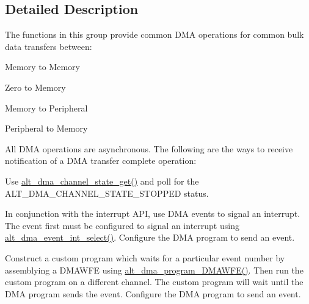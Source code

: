 \subsection{Detailed Description}
The functions in this group provide common D\+MA operations for common bulk data transfers between\+:
\begin{DoxyItemize}
\item Memory to Memory
\item Zero to Memory
\item Memory to Peripheral
\item Peripheral to Memory
\end{DoxyItemize}

All D\+MA operations are asynchronous. The following are the ways to receive notification of a D\+MA transfer complete operation\+:
\begin{DoxyItemize}
\item Use \mbox{\hyperlink{group__ALT__DMA__CSR_gafb12a5a452bf2d18013cf1bd8716f9fc}{alt\+\_\+dma\+\_\+channel\+\_\+state\+\_\+get()}} and poll for the A\+L\+T\+\_\+\+D\+M\+A\+\_\+\+C\+H\+A\+N\+N\+E\+L\+\_\+\+S\+T\+A\+T\+E\+\_\+\+S\+T\+O\+P\+P\+ED status.
\item In conjunction with the interrupt A\+PI, use D\+MA events to signal an interrupt. The event first must be configured to signal an interrupt using \mbox{\hyperlink{group__ALT__DMA__CSR_ga641f2673530bed7fffda687b8aabadb0}{alt\+\_\+dma\+\_\+event\+\_\+int\+\_\+select()}}. Configure the D\+MA program to send an event.
\item Construct a custom program which waits for a particular event number by assemblying a D\+M\+A\+W\+FE using \mbox{\hyperlink{group__ALT__DMA__PRG_gadb60b4036a6e054f81b4e2bf2dfb2223}{alt\+\_\+dma\+\_\+program\+\_\+\+D\+M\+A\+W\+F\+E()}}. Then run the custom program on a different channel. The custom program will wait until the D\+MA program sends the event. Configure the D\+MA program to send an event.
\end{DoxyItemize}

